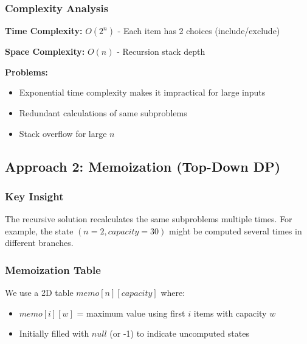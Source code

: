 \documentclass[12pt,a4paper]{article}
\begin{document}
\subsubsection{Complexity Analysis}
\textbf{Time Complexity:} $O(2^n)$ - Each item has 2 choices (include/exclude)

\textbf{Space Complexity:} $O(n)$ - Recursion stack depth

\textbf{Problems:}
\begin{itemize}
\item Exponential time complexity makes it impractical for large inputs
\item Redundant calculations of same subproblems
\item Stack overflow for large $n$
\end{itemize}

\subsection{Approach 2: Memoization (Top-Down DP)}

\subsubsection{Key Insight}
The recursive solution recalculates the same subproblems multiple times. For example, the state $(n=2, capacity=30)$ might be computed several times in different branches.

\subsubsection{Memoization Table}
We use a 2D table $memo[n][capacity]$ where:
\begin{itemize}
\item $memo[i][w]$ = maximum value using first $i$ items with capacity $w$
\item Initially filled with $null$ (or -1) to indicate uncomputed states
\end{itemize}
\end{document}
